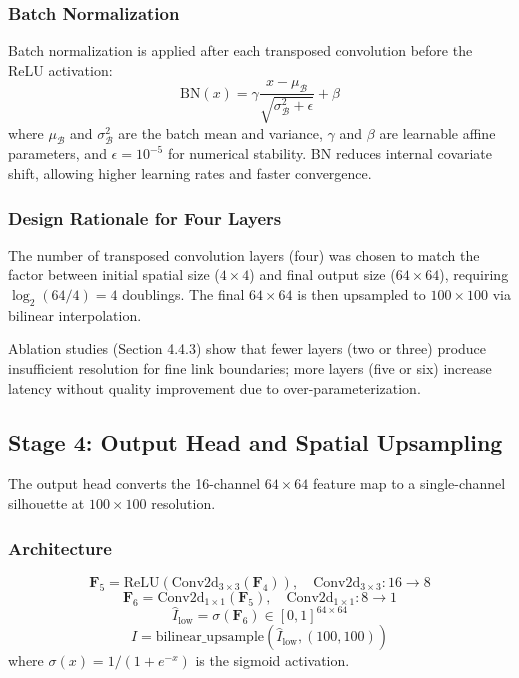 \documentclass[12pt,a4paper,oneside]{report}
\begin{document}
\subsubsection{Batch Normalization}

Batch normalization is applied after each transposed convolution before the ReLU activation:
\begin{equation}
\text{BN}(x) = \gamma \frac{x - \mu_{\mathcal{B}}}{\sqrt{\sigma_{\mathcal{B}}^2 + \epsilon}} + \beta
\end{equation}
where $\mu_{\mathcal{B}}$ and $\sigma_{\mathcal{B}}^2$ are the batch mean and variance, $\gamma$ and $\beta$ are learnable affine parameters, and $\epsilon = 10^{-5}$ for numerical stability. BN reduces internal covariate shift, allowing higher learning rates and faster convergence.

\subsubsection{Design Rationale for Four Layers}

The number of transposed convolution layers (four) was chosen to match the factor between initial spatial size ($4 \times 4$) and final output size ($64 \times 64$), requiring $\log_2(64/4) = 4$ doublings. The final $64 \times 64$ is then upsampled to $100 \times 100$ via bilinear interpolation.

Ablation studies (Section 4.4.3) show that fewer layers (two or three) produce insufficient resolution for fine link boundaries; more layers (five or six) increase latency without quality improvement due to over-parameterization.

\subsection{Stage 4: Output Head and Spatial Upsampling}

The output head converts the 16-channel $64 \times 64$ feature map to a single-channel silhouette at $100 \times 100$ resolution.

\subsubsection{Architecture}

\begin{equation}
\mathbf{F}_5 = \text{ReLU}(\text{Conv2d}_{3\times3}(\mathbf{F}_4)), \quad \text{Conv2d}_{3\times3}: 16 \rightarrow 8
\end{equation}
\begin{equation}
\mathbf{F}_6 = \text{Conv2d}_{1\times1}(\mathbf{F}_5), \quad \text{Conv2d}_{1\times1}: 8 \rightarrow 1
\end{equation}
\begin{equation}
\hat{I}_{\text{low}} = \sigma(\mathbf{F}_6) \in [0, 1]^{64 \times 64}
\end{equation}
\begin{equation}
\hat{I} = \text{bilinear\_upsample}(\hat{I}_{\text{low}}, (100, 100))
\end{equation}
where $\sigma(x) = 1/(1 + e^{-x})$ is the sigmoid activation.
\end{document}
